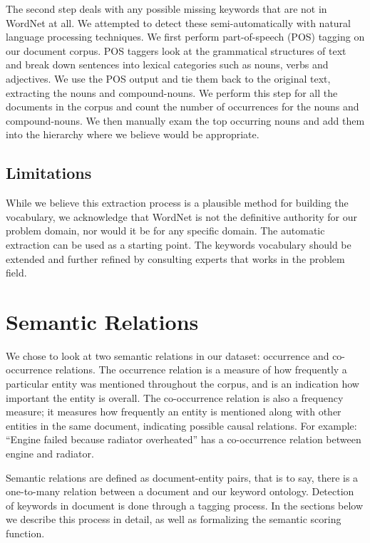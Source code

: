 The second step deals with any possible missing keywords that are not in WordNet
at all. We attempted to detect these semi-automatically with natural
language processing techniques. We first perform part-of-speech (POS) tagging on our document 
corpus. POS taggers look at the grammatical structures of text and break down 
sentences into lexical categories such as nouns, verbs and adjectives. We use the 
POS output and tie them back to the original text, extracting the nouns and 
compound-nouns. We perform this step for all the documents in the corpus and 
count the number of occurrences for the nouns and compound-nouns. We then manually 
exam the top occurring nouns and add them into the hierarchy where we believe 
would be appropriate.

\subsection{Limitations}
While we believe this extraction process is a plausible method for building the
vocabulary, we acknowledge that WordNet is not the definitive authority for our 
problem domain, nor would it be for any specific domain. The automatic
extraction can be used as a starting point. The keywords vocabulary should be
extended and further refined by consulting experts that works in the problem field. 



\section{Semantic Relations}
We chose to look at two semantic relations in our dataset: occurrence and
co-occurrence relations. The occurrence relation is a measure of how frequently
a particular entity was mentioned throughout the corpus, and is an
indication how important the entity is overall. The co-occurrence relation is
also a frequency measure; it measures how frequently an entity is mentioned along
with other entities in the same document, indicating possible causal relations.
For example: ``Engine failed because radiator overheated'' has a co-occurrence
relation between engine and radiator.

Semantic relations are defined as document-entity pairs, that is to say, there
is a one-to-many relation between a document and our keyword ontology. Detection of
keywords in document is done through a tagging process. In the sections below we
describe this process in detail, as well as formalizing the semantic scoring
function.
 

